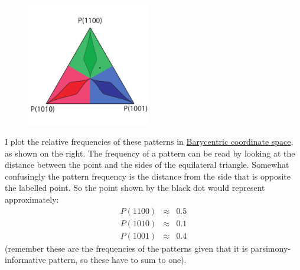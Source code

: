 \documentclass[11pt]{article}
\begin{document}
\begin{figure}
  \begin{center}
   \vspace{-40pt}
    \includegraphics[width=0.48\textwidth]{../newimages/simple-treespace-sample.pdf}
   \vspace{-0pt}
   \vspace{-40pt}
  \end{center}
\end{figure}
I plot the relative frequencies of these patterns in \href{http://en.wikipedia.org/wiki/Barycentric_coordinate_system_(mathematics)}{Barycentric coordinate space}, as shown on the right.
The frequency of a pattern can be read by looking at the distance between the point and the sides of the equilateral triangle.
Somewhat confusingly the pattern frequency is the distance from the side that is opposite the labelled point.
So the point shown by the black dot would represent approximately:
\begin{eqnarray*}
	P(1100) & \approx & 0.5\\
	P(1010) & \approx & 0.1\\
	P(1001) & \approx & 0.4
\end{eqnarray*}
(remember these are the frequencies of the patterns given that it is parsimony-informative pattern, so these have to sum to one).
\end{document}
